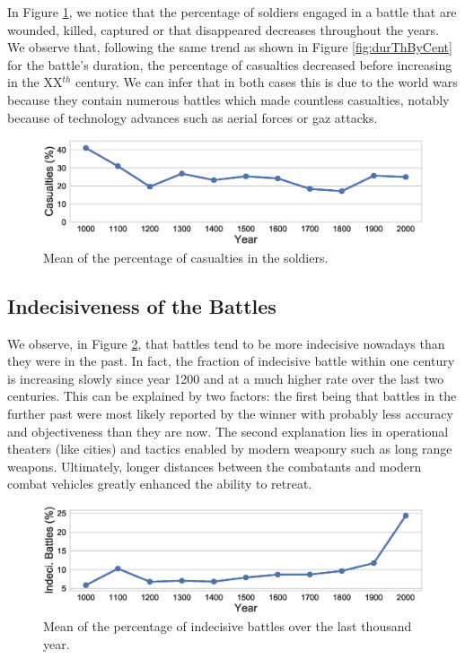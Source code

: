 In Figure \ref{fig:casuPerCent}, we notice that the percentage of soldiers engaged in a battle that are wounded, killed, captured or that disappeared decreases throughout the years. We observe that, following the same trend as shown in Figure \ref{fig:durThByCent} for the battle's duration, the percentage of casualties decreased before increasing in the XX$^{th}$ century. We can infer that in both cases this is due to the world wars because they contain numerous battles which made countless casualties, notably because of technology advances such as aerial forces or gaz attacks.
 \begin{figure}[h]
	\centering	\includegraphics[width=\linewidth]{figures/casuPerCent}
	\caption{Mean of the percentage of casualties in the soldiers.}\label{fig:casuPerCent}
	\centering
\end{figure}

\subsection{Indecisiveness of the Battles}

We observe, in Figure \ref{fig:IndecBattles}, that battles tend to be more indecisive nowadays than they were in the past. In fact, the fraction of indecisive battle within one century is increasing slowly since year 1200 and at a much higher rate over the last two centuries. This can be explained by two factors: the first being that battles in the further past were most likely reported by the winner with probably less accuracy and objectiveness than they are now. The second explanation lies in operational theaters (like cities) and tactics enabled by modern weaponry such as long range weapons. Ultimately, longer distances between the combatants and modern combat vehicles greatly enhanced the ability to retreat.

 \begin{figure}[h]
	\centering	\includegraphics[width=\linewidth]{figures/indThByCent}
	\caption{Mean of the percentage of indecisive battles over the last thousand year.}\label{fig:IndecBattles}
	\centering
\end{figure}

